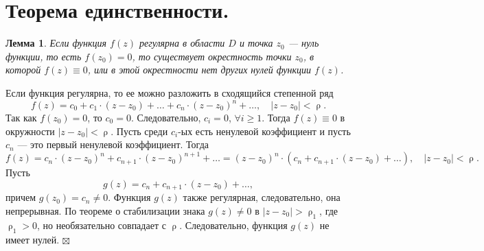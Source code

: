 \documentclass[a4paper, 12pt]{article}
\newenvironment{Proof} %
{\par\noindent{$\blacklozenge$}} %
{\hfill$\scriptstyle\boxtimes$}
\renewcommand{\geq}{\geqslant}
\renewcommand{\rho}{\uprho}
\newtheorem*{lem}{Лемма}
\begin{document}
\section{Теорема единственности.}
\begin{lem}
	Если функция $f(z)$ регулярна в области $D$ и точка $z_0$ --- нуль функции, то есть $f(z_0) = 0$, то существует окрестность точки $z_0$, в которой $f(z)\equiv 0$, или в этой окрестности нет других нулей функции $f(z)$.
\end{lem}\begin{Proof}
Если функция регулярна, то ее можно разложить в сходящийся степенной ряд $$f(z) = c_0 + c_1\cdot (z-z_0) + \ldots + c_n\cdot (z-z_0)^n + \ldots,\quad |z-z_0|<\rho.$$
Так как $f(z_0) = 0$, то $c_0 = 0$. Следовательно, $c_i = 0$, $\forall i \geq 1$. Тогда $f(z) \equiv 0$ в окружности $|z-z_0|<\rho$.
Пусть среди $c_i$-ых есть ненулевой коэффициент и пусть $c_n$ --- это первый ненулевой коэффициент. Тогда $$f(z) = c_n\cdot (z-z_0)^n + c_{n+1}\cdot (z-z_0)^{n+1} + \ldots = (z-z_0)^n\cdot (c_n + c_{n+1}\cdot (z-z_0) + \ldots),\quad |z-z_0| < \rho.$$
Пусть $$g(z) =c_n + c_{n+1}\cdot (z-z_0) + \ldots,$$
причем $g(z_0) = c_n \ne 0$. Функция $g(z)$ также регулярная, следовательно, она непрерывная. По теореме о стабилизации знака $g(z)\ne 0$ в $|z-z_0| > \rho_1$, где $\rho_1 > 0$, но необязательно совпадает с $\rho$. Следовательно, функция $g(z)$ не имеет нулей.
\end{Proof}
\end{document}

